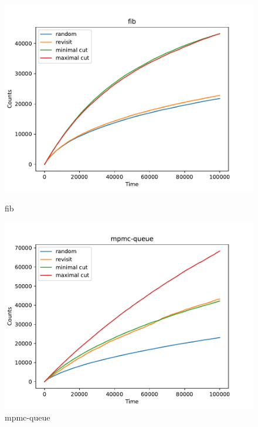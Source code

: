 \begin{figure}[h!]
	\begin{minipage}{0.45\textwidth}
		\centering
		\includegraphics[width=\textwidth]{figure/genmc/fib.pdf}
		\caption{fib}
		\label{genmc:fib}
	\end{minipage}
	\hfill
	\begin{minipage}{0.45\textwidth}
		\centering
		\includegraphics[width=\textwidth]{figure/genmc/mpmc-queue.pdf}
		\caption{mpmc-queue}
		\label{genmc:mpmc-queue}
	\end{minipage}

	\vspace{0.5cm}


\end{figure}
